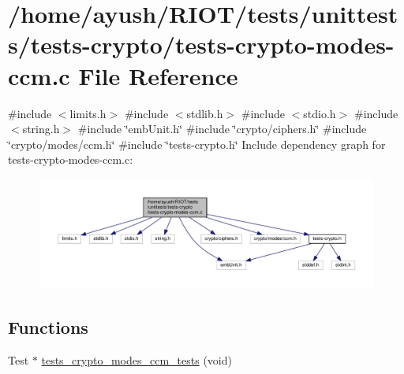 \hypertarget{tests-crypto-modes-ccm_8c}{}\section{/home/ayush/\+R\+I\+O\+T/tests/unittests/tests-\/crypto/tests-\/crypto-\/modes-\/ccm.c File Reference}
\label{tests-crypto-modes-ccm_8c}
{\ttfamily \#include $<$limits.\+h$>$}\newline
{\ttfamily \#include $<$stdlib.\+h$>$}\newline
{\ttfamily \#include $<$stdio.\+h$>$}\newline
{\ttfamily \#include $<$string.\+h$>$}\newline
{\ttfamily \#include \char`\"{}emb\+Unit.\+h\char`\"{}}\newline
{\ttfamily \#include \char`\"{}crypto/ciphers.\+h\char`\"{}}\newline
{\ttfamily \#include \char`\"{}crypto/modes/ccm.\+h\char`\"{}}\newline
{\ttfamily \#include \char`\"{}tests-\/crypto.\+h\char`\"{}}\newline
Include dependency graph for tests-\/crypto-\/modes-\/ccm.c\+:
\nopagebreak
\begin{figure}[H]
\begin{center}
\leavevmode
\includegraphics[width=350pt]{tests-crypto-modes-ccm_8c__incl}
\end{center}
\end{figure}
\subsection*{Functions}
\begin{DoxyCompactItemize}
\item 
Test $\ast$ \hyperlink{group__unittests_gadf1db8c6d373f13fccc185fdf2b43be6}{tests\+\_\+crypto\+\_\+modes\+\_\+ccm\+\_\+tests} (void)
\end{DoxyCompactItemize}
